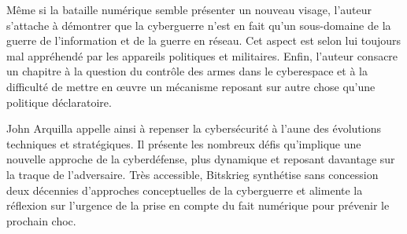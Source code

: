 \documentclass[a4paper]{article}
\begin{document}
Même si la bataille numérique semble présenter un nouveau visage, l’auteur s’attache à démontrer que la cyberguerre n’est en fait qu’un sous-domaine de la guerre de l’information et de la guerre en réseau. Cet aspect est selon lui toujours mal appréhendé par les appareils politiques et militaires. Enfin, l’auteur consacre un chapitre à la question du contrôle des armes dans le cyberespace et à la difficulté de mettre en œuvre un mécanisme reposant sur autre chose qu’une politique déclaratoire.

John Arquilla appelle ainsi à repenser la cybersécurité à l’aune des évolutions techniques et stratégiques. Il présente les nombreux défis qu’implique une nouvelle approche de la cyberdéfense, plus dynamique et reposant davantage sur la traque de l’adversaire. Très accessible, Bitskrieg synthétise sans concession deux décennies d’approches conceptuelles de la cyberguerre et alimente la réflexion sur l’urgence de la prise en compte du fait numérique pour prévenir le prochain choc.
\end{document}
